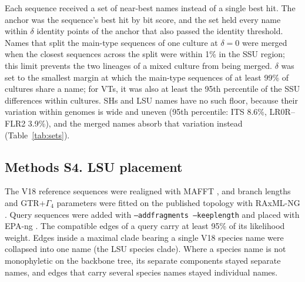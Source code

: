 \documentclass[11pt]{article}
\begin{document}
Each sequence received a set of near-best names instead of a single best hit. The anchor was the sequence's best hit
by bit score, and the set held every name within $\delta$ identity points of the anchor that also passed the identity
threshold. Names that split the main-type sequences of one culture at $\delta=0$ were merged when the closest
sequences across the split were within 1\% in the SSU region; this limit prevents the two lineages of a mixed culture
from being merged. $\delta$ was set to the smallest margin at which the main-type sequences of at least 99\% of
cultures share a name; for VTs, it was also at least the 95th percentile of the SSU differences within cultures. SHs
and LSU names have no such floor, because their variation within genomes is wide and uneven (95th percentile: ITS
8.6\%, LR0R--FLR2 3.9\%), and the merged names absorb that variation instead (Table~\ref{tab:sets}).

\subsection*{Methods S4. LSU placement}
The V18 reference sequences were realigned with MAFFT \cite{katoh2013mafft}, and branch lengths and GTR+$\Gamma_4$
parameters were fitted on the published topology with RAxML-NG \cite{kozlov2019raxmlng}. Query sequences were added
with \texttt{--addfragments --keeplength} and placed with EPA-ng \cite{barbera2019epang}. The compatible edges of a
query carry at least 95\% of its likelihood weight. Edges inside a maximal clade bearing a single V18 species name
were collapsed into one name (the LSU species clade). Where a species name is not monophyletic on the backbone tree,
its separate components stayed separate names, and edges that carry several species names stayed individual names.
\end{document}
